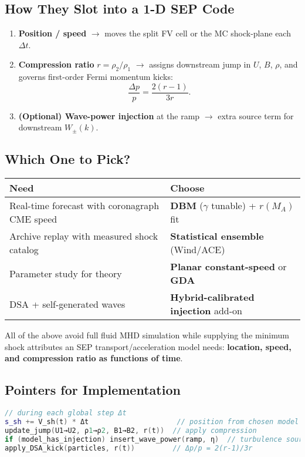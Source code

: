 \subsection*{How They Slot into a 1-D SEP Code}

\begin{enumerate}
    \item \textbf{Position / speed} $\rightarrow$ moves the split FV cell or the MC shock-plane each $\Delta t$.
    \item \textbf{Compression ratio} $r = \rho_2 / \rho_1$ $\rightarrow$ assigns downstream jump in $U$, $B$, $\rho$, and governs first-order Fermi momentum kicks:
    \[
        \frac{\Delta p}{p} = \frac{2(r - 1)}{3r}.
    \]
    \item \textbf{(Optional) Wave-power injection} at the ramp $\rightarrow$ extra source term for downstream $W_\pm(k)$.
\end{enumerate}

\subsection*{Which One to Pick?}

\begin{center}
\begin{tabular}{p{7cm} p{7cm}}
\toprule
\textbf{Need} & \textbf{Choose} \\
\midrule
Real-time forecast with coronagraph CME speed & \textbf{DBM} ($\gamma$ tunable) + $r(M_A)$ fit \\
Archive replay with measured shock catalog & \textbf{Statistical ensemble} (Wind/ACE) \\
Parameter study for theory & \textbf{Planar constant-speed} or \textbf{GDA} \\
DSA + self-generated waves & \textbf{Hybrid-calibrated injection} add-on \\
\bottomrule
\end{tabular}
\end{center}

All of the above avoid full fluid MHD simulation while supplying the minimum shock attributes an SEP transport/acceleration model needs: \textbf{location, speed, and compression ratio as functions of time}.

\subsection*{Pointers for Implementation}

\begin{lstlisting}[language=C++,basicstyle=\ttfamily\footnotesize]
// during each global step Δt
s_sh += V_sh(t) * Δt                     // position from chosen model
update_jump(U1→U2, ρ1→ρ2, B1→B2, r(t))  // apply compression
if (model_has_injection) insert_wave_power(ramp, η)  // turbulence source
apply_DSA_kick(particles, r(t))         // Δp/p = 2(r-1)/3r
\end{lstlisting}

